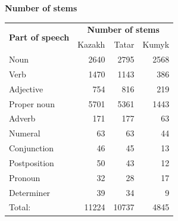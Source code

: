 \documentclass[a0paper,fontscale=0.3]{baposter}  %
\newcommand{\htwo}[1]{{\htwofont \textbf{\dotfill{}#1\dotfill{}}}}
\begin{document}
\begin{poster}
{			\htwo{Number of stems}
			\vspace{-1.5em}
			\begin{tabular}{lrrr}
				\toprule
				\multirow{2}{*}{\textbf{Part of speech}} & \multicolumn{3}{c}{\textbf{Number of stems}} \\ \cline{2-4}
				& Kazakh & Tatar & Kumyk \\
				\midrule
				Noun & 2640 & 2795 & 2568 \\
				Verb & 1470 & 1143 & 386 \\
				Adjective & 754 & 816 & 219 \\
				Proper noun & 5701 & 5361 & 1443 \\
				Adverb & 171 & 177 & 63 \\
				Numeral & 63 & 63 & 44 \\
				Conjunction & 46 & 45 & 13 \\
				Postposition & 50 & 43 & 12 \\
				Pronoun & 32 & 28 & 17 \\
				Determiner & 39 & 34 & 9 \\
				\midrule
				Total: & 11224 & 10737 & 4845 \\
				\bottomrule
			\end{tabular}
			\vspace{2em}


}
\end{poster}
\end{document}
